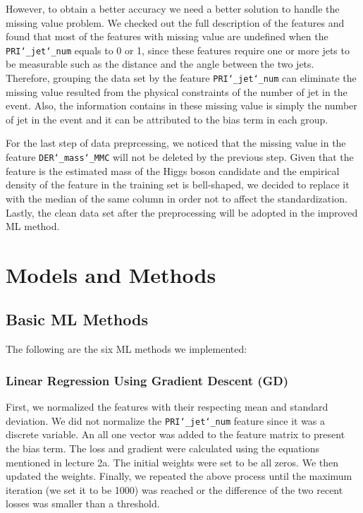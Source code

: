 \documentclass[10pt,conference,compsocconf]{IEEEtran}
\begin{document}
However, to obtain a better accuracy we need a better solution to handle the missing value problem. We checked out the full description of the features and found that most of the features with missing value are undefined when the \texttt{PRI\char`_jet\char`_num} equals to 0 or 1, since these features require one or more jets to be measurable such as the distance and the angle between the two jets. Therefore, grouping the data set by the feature \texttt{PRI\char`_jet\char`_num} can eliminate the missing value resulted from the physical constraints of the number of jet in the event. Also, the information contains in these missing value is simply the number of jet in the event and it can be attributed to the bias term in each group.

For the last step of data preprcessing, we noticed that the missing value in the feature \texttt{DER\char`_mass\char`_MMC} will not be deleted by the previous step. Given that the feature is the estimated mass of the Higgs boson candidate and the empirical density of the feature in the training set is bell-shaped, we decided to replace it with the median of the same column in order not to affect the standardization. Lastly, the clean data set after the preprocessing will be adopted in the improved ML method.


\section{Models and Methods}
\label{sec:models-methods}

\subsection{Basic ML Methods}

The following are the six ML methods we implemented:

\subsubsection{Linear Regression Using Gradient Descent (GD)}\hfill
\label{subsec:linear-regression}

First, we normalized the features with their respecting mean and standard deviation. We did not normalize the \texttt{PRI\char`_jet\char`_num} feature since it was a discrete variable. An all one vector was added to the feature matrix to present the bias term. The loss and gradient were calculated using the equations mentioned in lecture 2a. The initial weights were set to be all zeros. We then updated the weights. Finally, we repeated the above process until the maximum iteration (we set it to be 1000) was reached or the difference of the two recent losses was smaller than a threshold.
\end{document}
